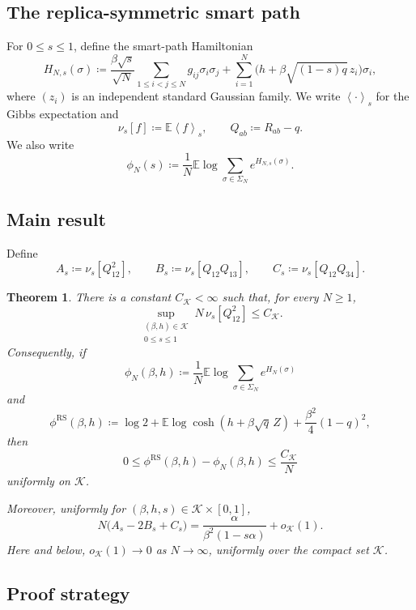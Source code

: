 \documentclass[11pt]{article}
\newtheorem{theorem}{Theorem}[section]
\numberwithin{equation}{section}
\newcommand{\E}{\mathbb{E}}
\newcommand{\1}{\mathbf 1}
\newcommand{\cK}{\mathcal K}
\newcommand{\braket}[1]{\left\langle #1\right\rangle}
\begin{document}
\subsection{The replica-symmetric smart path}

For $0\le s\le1$, define the smart-path Hamiltonian
\begin{equation}
 H_{N,s}(\sigma)
 \coloneqq
 \frac{\beta\sqrt s}{\sqrt N}
 \sum_{1\le i<j\le N}g_{ij}\sigma_i\sigma_j
 +\sum_{i=1}^N
 \bigl(h+\beta\sqrt{(1-s)q}\,z_i\bigr)\sigma_i,
 \label{eq:path}
\end{equation}
where $(z_i)$ is an independent standard Gaussian family.  We write
$\braket{\cdot}_s$ for the Gibbs expectation and
\[
 \nu_s[f]\coloneqq\E\braket{f}_s,\qquad
 Q_{ab}\coloneqq R_{ab}-q.
\]
We also write
\begin{equation}
 \phi_N(s)\coloneqq\frac1N\E\log
 \sum_{\sigma\in\Sigma_N}e^{H_{N,s}(\sigma)}.
 \label{eq:pathfreeenergy}
\end{equation}

\subsection{Main result}

Define
\begin{equation}
 A_s\coloneqq\nu_s[Q_{12}^2],\qquad
 B_s\coloneqq\nu_s[Q_{12}Q_{13}],\qquad
 C_s\coloneqq\nu_s[Q_{12}Q_{34}].
 \label{eq:ABC}
\end{equation}

\begin{theorem}
\label{thm:main}
There is a constant $C_{\cK}<\infty$ such that, for every $N\ge1$,
\[
 \sup_{\substack{(\beta,h)\in\cK\\0\le s\le1}}
 N\,\nu_s[Q_{12}^2]\le C_{\cK}.
\]
Consequently, if
\[
 \phi_N(\beta,h)\coloneqq
 \frac1N\E\log\sum_{\sigma\in\Sigma_N}e^{H_N(\sigma)}
\]
and
\[
 \phi^{\mathrm{RS}}(\beta,h)
 \coloneqq
 \log2+\E\log\cosh(h+\beta\sqrt q\,Z)
 +\frac{\beta^2}{4}(1-q)^2,
\]
then
\[
 0\le\phi^{\mathrm{RS}}(\beta,h)-\phi_N(\beta,h)
 \le\frac{C_{\cK}}N
\]
uniformly on $\cK$.

Moreover, uniformly for $(\beta,h,s)\in\cK\times[0,1]$,
\[
 N\bigl(A_s-2B_s+C_s\bigr)
 =
 \frac{\alpha}{\beta^2(1-s\alpha)}+o_{\cK}(1).
\]
Here and below, $o_{\cK}(1)\to0$ as $N\to\infty$, uniformly over the
 compact set $\mathcal K$.
\end{theorem}

\subsection{Proof strategy}
\end{document}
